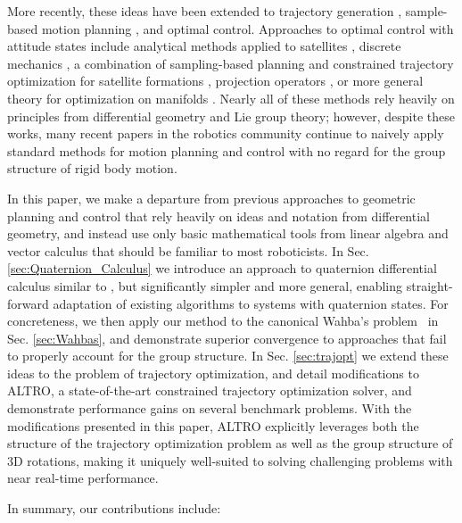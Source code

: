\documentclass[letterpaper, 10 pt, conference]{ieeeconf}  %
\begin{document}
    More recently, these ideas have been extended to trajectory generation
    \cite{Zefran1998}, sample-based motion planning \cite{Zefran1999,Kuffner2004}, and
    optimal control. Approaches to optimal control with attitude states include
    analytical methods applied to satellites \cite{Spindler1998}, discrete mechanics
    \cite{Kobilarov2011,Kobilarov2014, Lee2008}, a combination of sampling-based planning
    and constrained trajectory optimization for satellite formations \cite{Garcia2005,
    Aoude2008}, projection operators \cite{Saccon2013}, or more general theory for
    optimization on manifolds \cites{watterson2018trajectory}. Nearly all of these
    methods rely heavily on principles from differential geometry and Lie group theory;
    however, despite these works, many recent papers in the robotics community continue
    to naively apply standard methods for motion planning and control with no regard for the
    group structure of rigid body motion.
    
    In this paper, we make a departure from previous approaches to geometric planning and
    control that rely heavily on ideas and notation from differential geometry, and
    instead use only basic mathematical tools from linear algebra and vector calculus
    that should be familiar to most roboticists. In Sec. \ref{sec:Quaternion_Calculus} we
    introduce an approach to quaternion differential calculus similar to
    \cite{Mandic2011,Xu2016}, but significantly simpler and more general, enabling
    straight-forward adaptation of existing algorithms to systems with quaternion states.
    For concreteness, we then apply our method to the canonical Wahba's
    problem~\cite{Wahba1965} in Sec. \ref{sec:Wahbas}, and demonstrate superior
    convergence to approaches that fail to properly account for the group structure. In
    Sec. \ref{sec:trajopt} we extend these ideas to the problem of trajectory
    optimization, and detail modifications to ALTRO, a state-of-the-art constrained
    trajectory optimization solver, and demonstrate performance gains on several
    benchmark problems. With the modifications presented in this paper, ALTRO explicitly 
    leverages both the structure of the trajectory optimization problem as well as the 
    group structure of 3D rotations, making it uniquely well-suited to solving challenging
    problems with near real-time performance.

    In summary, our contributions include:
\end{document}
